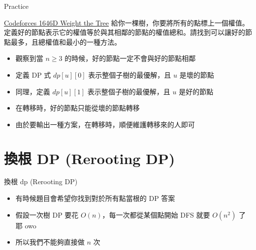 \documentclass[aspectratio=169]{beamer}
\begin{document}
    \begin{frame}{Practice}
        \begin{block}{\href{https://codeforces.com/problemset/problem/1646/D}{Codeforces 1646D Weight the Tree}}
        給你一棵樹，你要將所有的點標上一個權值。定義好的節點表示它的權值等於與其相鄰的節點的權值總和。請找到可以讓好的節點最多，且總權值和最小的一種方法。
        \end{block}
        \begin{itemize}
            \item<2-> 觀察到當 $n \ge 3$ 的時候，好的節點一定不會與好的節點相鄰
            \item<3-> 定義 DP 式 $dp[u][0]$ 表示整個子樹的最優解，且 $u$ 是壞的節點
            \item<3-> 同理，定義 $dp[u][1]$ 表示整個子樹的最優解，且 $u$ 是好的節點
            \item<4-> 在轉移時，好的節點只能從壞的節點轉移
            \item<5-> 由於要輸出一種方案，在轉移時，順便維護轉移來的人即可
        \end{itemize}
    \end{frame}
    
    
    \section{換根 DP (Rerooting DP)}
    \begin{frame}{換根 dp (Rerooting DP)}
        \begin{itemize}
            \item 有時候題目會希望你找到對於所有點當根的 DP 答案
            \item 假設一次樹 DP 要花 $O(n)$，每一次都從某個點開始 DFS 就要 $O(n^2)$ 了耶 owo
            \item 所以我們不能夠直接做 $n$ 次
        \end{itemize}
    \end{frame}
    
\end{document}

